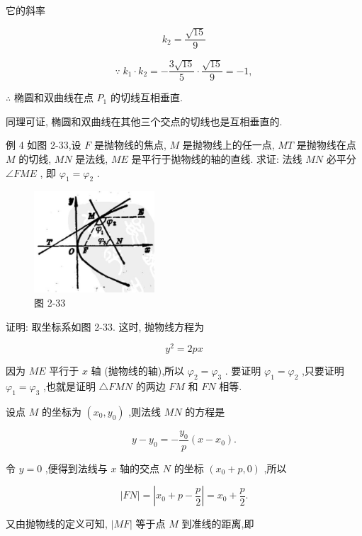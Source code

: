 \documentclass[lang=cn,newtx,10.5pt,scheme=chinese]{elegantbook}
\begin{document}
它的斜率

\[
    {k}_{2} = \frac{\sqrt{15}}{9}
\]

\[
  \because \;{k}_{1} \cdot {k}_{2} = - \frac{3\sqrt{15}}{5} \cdot \frac{\sqrt{15}}{9} = - 1,
\]

\(\therefore\) 椭圆和双曲线在点 \({P}_{1}\) 的切线互相垂直.

同理可证, 椭圆和双曲线在其他三个交点的切线也是互相垂直的.

例 4 如图 2-33,设 \(F\) 是抛物线的焦点, \(M\) 是抛物线上的任一点, \({MT}\) 是抛物线在点 \(M\) 的切线, \({MN}\) 是法线, \({ME}\) 是平行于抛物线的轴的直线. 求证: 法线 \({MN}\) 必平分 \(\angle {FME}\) , 即 \({\varphi }_{1} = {\varphi }_{2}\) .

\begin{figure}[h]
  \centering
  \includegraphics[max width=0.4\textwidth]{images/01912cc2-ffb6-728e-9ae7-b113ff05c64b_122_544824.jpg}
  \caption{图 2-33}
\end{figure}



证明: 取坐标系如图 2-33. 这时, 抛物线方程为

\[
    {y}^{2} = {2px}
\]

因为 \({ME}\) 平行于 \(x\) 轴 (抛物线的轴),所以 \({\varphi }_{2} = {\varphi }_{3}\) . 要证明 \({\varphi }_{1} = {\varphi }_{2}\) ,只要证明 \({\varphi }_{1} = {\varphi }_{3}\) ,也就是证明 \(\bigtriangleup {FMN}\) 的两边 \({FM}\) 和 \({FN}\) 相等.

设点 \(M\) 的坐标为 \(\left( {{x}_{0},{y}_{0}}\right)\) ,则法线 \({MN}\) 的方程是

\[
  y - {y}_{0} = - \frac{{y}_{0}}{p}\left( {x - {x}_{0}}\right) .
\]

令 \(y = 0\) ,便得到法线与 \(x\) 轴的交点 \(N\) 的坐标 \(\left( {{x}_{0} + p,0}\right)\) ,所以

\[
  \left| {FN}\right| = \left| {{x}_{0} + p - \frac{p}{2}}\right| = {x}_{0} + \frac{p}{2}.
\]

又由抛物线的定义可知, \(\left| {MF}\right|\) 等于点 \(M\) 到准线的距离,即
\end{document}
